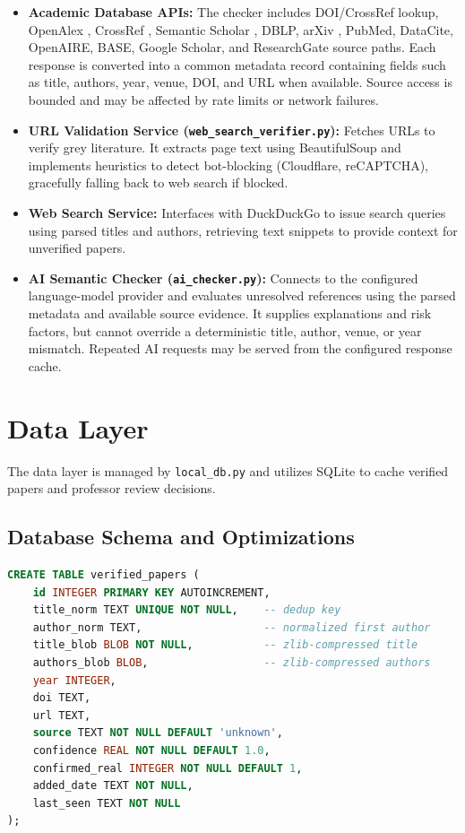 \documentclass[12pt,a4paper,oneside]{report}
\begin{document}
\begin{itemize}
    \item \textbf{Academic Database APIs:} The checker includes DOI/CrossRef lookup, OpenAlex \cite{openalex2024}, CrossRef \cite{crossref2024}, Semantic Scholar \cite{semanticscholar2024}, DBLP, arXiv \cite{arxiv2024}, PubMed, DataCite, OpenAIRE, BASE, Google Scholar, and ResearchGate source paths. Each response is converted into a common metadata record containing fields such as title, authors, year, venue, DOI, and URL when available. Source access is bounded and may be affected by rate limits or network failures.
    \item \textbf{URL Validation Service (\texttt{web\_search\_verifier.py}):} Fetches URLs to verify grey literature. It extracts page text using BeautifulSoup and implements heuristics to detect bot-blocking (Cloudflare, reCAPTCHA), gracefully falling back to web search if blocked.
    \item \textbf{Web Search Service:} Interfaces with DuckDuckGo to issue search queries using parsed titles and authors, retrieving text snippets to provide context for unverified papers.
    \item \textbf{AI Semantic Checker (\texttt{ai\_checker.py}):} Connects to the configured language-model provider and evaluates unresolved references using the parsed metadata and available source evidence. It supplies explanations and risk factors, but cannot override a deterministic title, author, venue, or year mismatch. Repeated AI requests may be served from the configured response cache.
\end{itemize}

\section{Data Layer}

The data layer is managed by \texttt{local\_db.py} and utilizes SQLite \cite{sqlite2026} to cache verified papers and professor review decisions.

\subsection{Database Schema and Optimizations}

\begin{lstlisting}[language=SQL]
CREATE TABLE verified_papers (
    id INTEGER PRIMARY KEY AUTOINCREMENT,
    title_norm TEXT UNIQUE NOT NULL,    -- dedup key
    author_norm TEXT,                   -- normalized first author
    title_blob BLOB NOT NULL,           -- zlib-compressed title
    authors_blob BLOB,                  -- zlib-compressed authors
    year INTEGER,
    doi TEXT,
    url TEXT,
    source TEXT NOT NULL DEFAULT 'unknown',
    confidence REAL NOT NULL DEFAULT 1.0,
    confirmed_real INTEGER NOT NULL DEFAULT 1,
    added_date TEXT NOT NULL,
    last_seen TEXT NOT NULL
);
\end{lstlisting}
\end{document}
